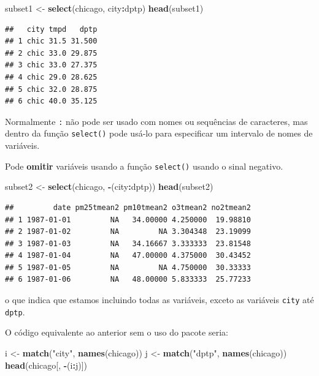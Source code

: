 \documentclass[]{book}
\newenvironment{Shaded}{\begin{snugshade}}{\end{snugshade}}
\newcommand{\KeywordTok}[1]{\textcolor[rgb]{0.13,0.29,0.53}{\textbf{#1}}}
\newcommand{\NormalTok}[1]{#1}
\newcommand{\OperatorTok}[1]{\textcolor[rgb]{0.81,0.36,0.00}{\textbf{#1}}}
\newcommand{\StringTok}[1]{\textcolor[rgb]{0.31,0.60,0.02}{#1}}
\begin{document}
\begin{Shaded}
\begin{Highlighting}[]
\NormalTok{subset1 <-}\StringTok{ }\KeywordTok{select}\NormalTok{(chicago, city}\OperatorTok{:}\NormalTok{dptp)}
\KeywordTok{head}\NormalTok{(subset1)}
\end{Highlighting}
\end{Shaded}

\begin{verbatim}
##   city tmpd   dptp
## 1 chic 31.5 31.500
## 2 chic 33.0 29.875
## 3 chic 33.0 27.375
## 4 chic 29.0 28.625
## 5 chic 32.0 28.875
## 6 chic 40.0 35.125
\end{verbatim}

Normalmente \texttt{:} não pode ser usado com nomes ou sequências de caracteres, mas dentro da função \texttt{select()} pode usá-lo para especificar um intervalo de nomes de variáveis.

Pode \textbf{omitir} variáveis usando a função \texttt{select()} usando o sinal negativo.

\begin{Shaded}
\begin{Highlighting}[]
\NormalTok{subset2 <-}\StringTok{ }\KeywordTok{select}\NormalTok{(chicago, }\OperatorTok{-}\NormalTok{(city}\OperatorTok{:}\NormalTok{dptp))}
\KeywordTok{head}\NormalTok{(subset2)}
\end{Highlighting}
\end{Shaded}

\begin{verbatim}
##         date pm25tmean2 pm10tmean2 o3tmean2 no2tmean2
## 1 1987-01-01         NA   34.00000 4.250000  19.98810
## 2 1987-01-02         NA         NA 3.304348  23.19099
## 3 1987-01-03         NA   34.16667 3.333333  23.81548
## 4 1987-01-04         NA   47.00000 4.375000  30.43452
## 5 1987-01-05         NA         NA 4.750000  30.33333
## 6 1987-01-06         NA   48.00000 5.833333  25.77233
\end{verbatim}

o que indica que estamos incluindo todas as variáveis, exceto as variáveis \texttt{city} até \texttt{dptp}.

O código equivalente ao anterior sem o uso do pacote seria:

\begin{Shaded}
\begin{Highlighting}[]
\NormalTok{i <-}\StringTok{ }\KeywordTok{match}\NormalTok{(}\StringTok{"city"}\NormalTok{, }\KeywordTok{names}\NormalTok{(chicago))}
\NormalTok{j <-}\StringTok{ }\KeywordTok{match}\NormalTok{(}\StringTok{"dptp"}\NormalTok{, }\KeywordTok{names}\NormalTok{(chicago))}
\KeywordTok{head}\NormalTok{(chicago[, }\OperatorTok{-}\NormalTok{(i}\OperatorTok{:}\NormalTok{j)])}
\end{Highlighting}
\end{Shaded}
\end{document}
